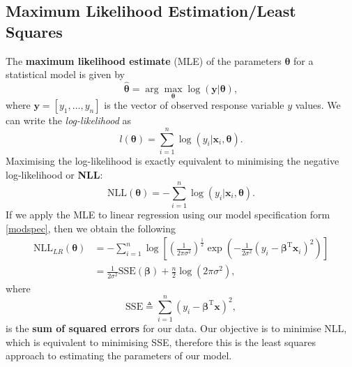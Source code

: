 \documentclass[10pt,a4paper]{article}
\numberwithin{equation}{section}
\theoremstyle{plain}
\theoremstyle{own}
\begin{document}
\subsection{Maximum Likelihood Estimation/Least Squares}
The \textbf{maximum likelihood estimate} (MLE) of the parameters $\boldsymbol\theta$ for a statistical model is given by
\begin{equation}
\hat{\boldsymbol\theta} = \arg \max_{\boldsymbol\theta} \log(\mathbf{y} | \boldsymbol\theta),
\end{equation}
where $\mathbf{y} = \left[ y_1, \ldots, y_n \right]$ is the vector of observed response variable $y$ values. We can write the \textit{log-likelihood} as
\begin{equation}
\mathit{l}(\boldsymbol\theta) = \sum_{i=1}^n \log(y_i | \mathbf{x}_i, \boldsymbol\theta).
\end{equation}
Maximising the log-likelihood is exactly equivalent to minimising the negative log-likelihood or \textbf{NLL}:
\begin{equation}
\mathrm{NLL}(\boldsymbol\theta) = -\sum_{i=1}^n \log(y_i | \mathbf{x}_i, \boldsymbol\theta).
\end{equation}
If we apply the MLE to linear regression using our model specification form \cref{modspec}, then we obtain the following
\begin{align}
\mathrm{NLL}_{LR}(\boldsymbol\theta) & = -\sum_{i=1}^n \log \left[ \left( \frac{1}{2 \pi \sigma^2} \right)^{\frac{1}{2}} \exp \left( - \frac{1}{2\sigma^2} (y_i - \boldsymbol\beta^{\text{T}} \mathbf{x}_i)^2 \right) \right]  \\
& = \frac{1}{2\sigma^2}\mathrm{SSE}(\boldsymbol\beta) + \frac{n}{2} \log(2 \pi \sigma^2),
\end{align}
where \[\mathrm{SSE} \triangleq \sum_{i=1}^n (y_i - \boldsymbol\beta^{\text{T}} \mathbf{x})^2,\]
is the \textbf{sum of squared errors} for our data. Our objective is to minimise NLL, which is equivalent to minimising SSE, therefore this is the least squares approach to estimating the parameters of our model.
\end{document}
